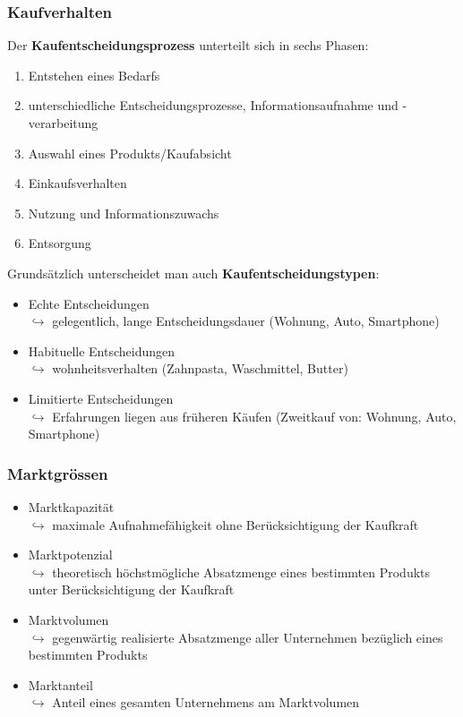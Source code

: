 \documentclass[12pt]{article}
\begin{document}
\subsubsection{Kaufverhalten}
Der \textbf{Kaufentscheidungsprozess} unterteilt sich in sechs Phasen:
\begin{enumerate}
    \item Entstehen eines Bedarfs
    \item unterschiedliche Entscheidungsprozesse, Informationsaufnahme und -verarbeitung
    \item Auswahl eines Produkts/Kaufabsicht
    \item Einkaufsverhalten
    \item Nutzung und Informationszuwachs
    \item Entsorgung
\end{enumerate}
Grundsätzlich unterscheidet man auch \textbf{Kaufentscheidungstypen}:
\begin{itemize}
    \item Echte Entscheidungen\\
    $\hookrightarrow$ gelegentlich, lange Entscheidungsdauer (Wohnung, Auto, Smartphone)
    \item Habituelle Entscheidungen\\
    $\hookrightarrow$ wohnheitsverhalten (Zahnpasta, Waschmittel, Butter)
    \item Limitierte Entscheidungen\\
    $\hookrightarrow$ Erfahrungen liegen aus früheren Käufen (Zweitkauf von: Wohnung, Auto, Smartphone)
\end{itemize}

\subsubsection{Marktgrössen}
\begin{itemize}
    \item Marktkapazität\\
    $\hookrightarrow$ maximale Aufnahmefähigkeit ohne Berücksichtigung der Kaufkraft
    \item Marktpotenzial\\
    $\hookrightarrow$ theoretisch höchstmögliche Absatzmenge eines bestimmten Produkts unter Berücksichtigung der Kaufkraft
    \item Marktvolumen\\
    $\hookrightarrow$ gegenwärtig realisierte Absatzmenge aller Unternehmen bezüglich eines bestimmten Produkts
    \item Marktanteil\\
    $\hookrightarrow$ Anteil eines gesamten Unternehmens am Marktvolumen
\end{itemize}
\end{document}
